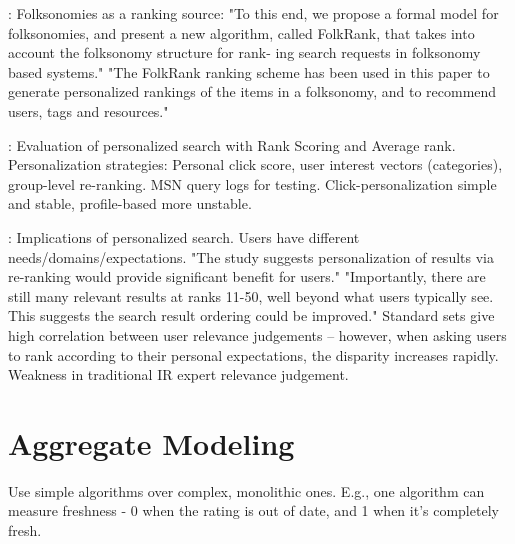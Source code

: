 \cite[p2]{Hotho}: Folksonomies as a ranking source: 
"To this end, we propose a formal model for folksonomies, and present a new algorithm, called FolkRank, that takes into account the folksonomy structure for rank- ing search requests in folksonomy based systems."
"The FolkRank ranking scheme has been used in this paper to generate personalized rankings of the items in a folksonomy, and to recommend users, tags and resources."

\cite{Dou2007}: Evaluation of personalized search with Rank Scoring and Average rank. 
Personalization strategies: Personal click score, user interest vectors (categories), 
group-level re-ranking. MSN query logs for testing. Click-personalization simple and stable, 
profile-based more unstable.

\cite[p2]{Teevan2005a}: Implications of personalized search. Users have different needs/domains/expectations.
"The study suggests personalization of results via re-ranking would provide significant benefit for users."
"Importantly, there are still many relevant results at ranks 11-50, well beyond what users typically see. 
This suggests the search result ordering could be improved."
Standard sets give high correlation between user relevance judgements -- however, when asking users
to rank according to their personal expectations, the disparity increases rapidly. Weakness in 
traditional IR expert relevance judgement.




\section{Aggregate Modeling}

Use simple algorithms over complex, monolithic ones. E.g., one algorithm can measure freshness - 0 when the rating is out of date, and 1 when it's completely fresh.


